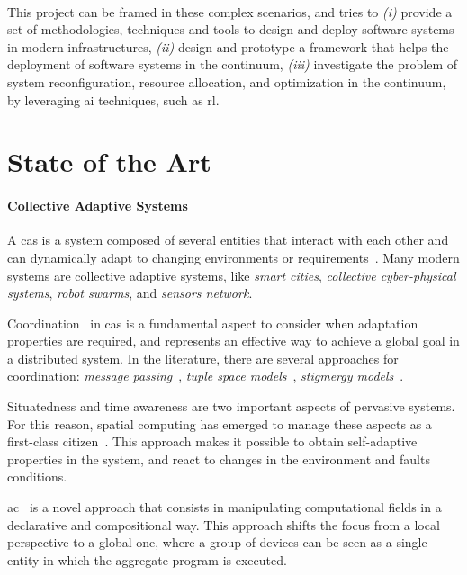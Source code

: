 \documentclass[12pt,a4paper]{article}
\begin{document}
\paragraph*{}
This project can be framed in these complex scenarios,
and tries to \emph{(i)} provide a set of methodologies, techniques and tools to design and deploy software systems in modern infrastructures,
\emph{(ii)} design and prototype a framework that helps the deployment of software systems in the continuum,
\emph{(iii)} investigate the problem of system reconfiguration, resource allocation, and optimization in the continuum,
by leveraging \ac{ai} techniques, such as \ac{rl}.

\section{State of the Art}\label{sec:state-of-the-art}

\paragraph{Collective Adaptive Systems}
A \ac{cas} is a system composed of several entities that interact with each other and can dynamically adapt to changing environments or requirements~\cite{DBLP:conf/birthday/HolzlW11}.
%
Many modern systems are collective adaptive systems,
like \emph{smart cities}, \emph{collective cyber-physical systems}, \emph{robot swarms}, and \emph{sensors network}.

Coordination~\cite{DBLP:journals/csur/Ciancarini96} in \ac{cas} is a fundamental aspect to consider when adaptation properties are required,
and represents an effective way to achieve a global goal in a distributed system.
%
In the literature,
there are several approaches for coordination:
\emph{message passing}~\cite{DBLP:journals/jacm/HondaYC16}, \emph{tuple space models}~\cite{DBLP:books/sp/omicini01/RossiCD01}, \emph{stigmergy models}~\cite{DBLP:journals/cogsr/Heylighen16}.

Situatedness and time awareness are two important aspects of pervasive systems.
%
For this reason,
spatial computing has emerged to manage these aspects as a first-class citizen~\cite{Beal_Viroli_2015}.
%
This approach makes it possible to obtain self-adaptive properties in the system,
and react to changes in the environment and faults conditions.

\ac{ac}~\cite{DBLP:journals/computer/BealPV15} is a novel approach that consists in manipulating computational fields in a declarative and compositional way.
%
This approach shifts the focus from a local perspective to a global one,
where a group of devices can be seen as a single entity in which the aggregate program is executed.
\end{document}
